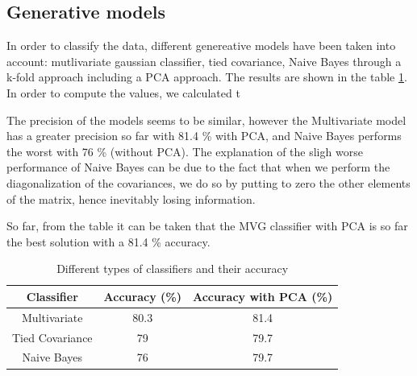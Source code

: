 \documentclass[twoside,a4paper,12pt]{report}
\begin{document}
\subsection{Generative models}

In order to classify the data, different genereative models have been taken into account:
mutlivariate gaussian classifier, tied covariance, Naive Bayes through a k-fold approach including a PCA approach.
 The results are shown in the table \ref{diffTypesclass}. In order to compute the values, we calculated t
 
 The precision of the models seems to be similar, however the Multivariate  model has a
 greater precision so far with 81.4 \% with PCA, and Naive Bayes performs the worst with 76 \% (without PCA). 
 The explanation of the sligh worse performance of Naive Bayes  can be due to the fact that when we 
 perform the diagonalization of the covariances, we do so by putting to zero the other elements
  of the matrix, hence inevitably losing information. 

 So far, from the table it can be taken that the MVG classifier with PCA is so far the best solution with
  a 81.4 \% accuracy.

\begin{table}
\centering
 \begin{tabular}{||c c c||} 
    \hline \hline
    Classifier & Accuracy (\%) & Accuracy with PCA (\%)\\
    \hline\hline
    Multivariate & 80.3 & 81.4  \\ 
    \hline
    Tied Covariance & 79 & 79.7  \\
    \hline
    Naive Bayes & 76 & 79.7 \\
    \hline \hline
\end{tabular}
\label{diffTypesclass}
\caption{Different types of classifiers and their accuracy}
\end{table}
\end{document}
